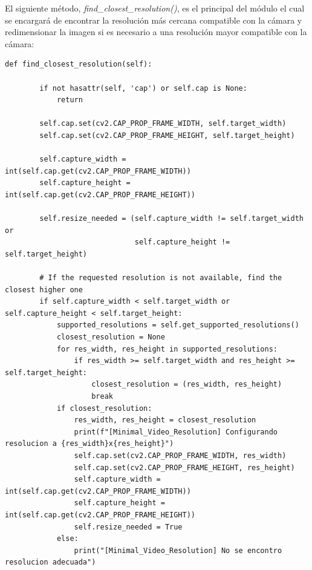 El siguiente método, \textit{find\_closest\_resolution()}, es el principal del módulo el cual se encargará de encontrar la resolución más cercana compatible con la cámara y redimensionar la imagen si es necesario a una resolución mayor compatible con la cámara:
\begin{lstlisting}[style=pythonstyle, caption={Método find\_closest\_resolution() de \textit{Minimal\_Video\_Resolution}}, label={lst:find_closest_resolution_minimal_video_resolution}]
def find_closest_resolution(self):
    
        if not hasattr(self, 'cap') or self.cap is None:
            return

        self.cap.set(cv2.CAP_PROP_FRAME_WIDTH, self.target_width)
        self.cap.set(cv2.CAP_PROP_FRAME_HEIGHT, self.target_height)

        self.capture_width = int(self.cap.get(cv2.CAP_PROP_FRAME_WIDTH))
        self.capture_height = int(self.cap.get(cv2.CAP_PROP_FRAME_HEIGHT))

        self.resize_needed = (self.capture_width != self.target_width or 
                              self.capture_height != self.target_height)

        # If the requested resolution is not available, find the closest higher one
        if self.capture_width < self.target_width or self.capture_height < self.target_height:
            supported_resolutions = self.get_supported_resolutions()
            closest_resolution = None
            for res_width, res_height in supported_resolutions:
                if res_width >= self.target_width and res_height >= self.target_height:
                    closest_resolution = (res_width, res_height)
                    break
            if closest_resolution:
                res_width, res_height = closest_resolution
                print(f"[Minimal_Video_Resolution] Configurando resolucion a {res_width}x{res_height}")
                self.cap.set(cv2.CAP_PROP_FRAME_WIDTH, res_width)
                self.cap.set(cv2.CAP_PROP_FRAME_HEIGHT, res_height)
                self.capture_width = int(self.cap.get(cv2.CAP_PROP_FRAME_WIDTH))
                self.capture_height = int(self.cap.get(cv2.CAP_PROP_FRAME_HEIGHT))
                self.resize_needed = True
            else:
                print("[Minimal_Video_Resolution] No se encontro resolucion adecuada")
\end{lstlisting}
\vspace{\baselineskip}

